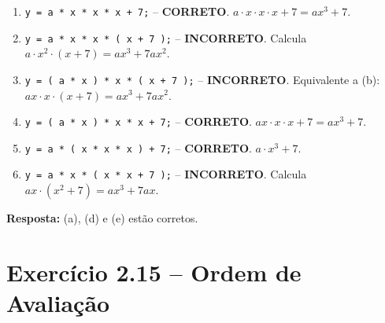 \documentclass[12pt,a4paper]{article}
\begin{document}
\begin{respostabox}
\begin{enumerate}[label=\textbf{\alph*)}]
\item \texttt{y = a * x * x * x + 7;} -- \textcolor{deitelgreen}{\textbf{CORRETO}}.
$a \cdot x \cdot x \cdot x + 7 = ax^3 + 7$.

\item \texttt{y = a * x * x * ( x + 7 );} -- \textcolor{deitelred}{\textbf{INCORRETO}}.
Calcula $a \cdot x^2 \cdot (x + 7) = ax^3 + 7ax^2$.

\item \texttt{y = ( a * x ) * x * ( x + 7 );} -- \textcolor{deitelred}{\textbf{INCORRETO}}.
Equivalente a (b): $ax \cdot x \cdot (x+7) = ax^3 + 7ax^2$.

\item \texttt{y = ( a * x ) * x * x + 7;} -- \textcolor{deitelgreen}{\textbf{CORRETO}}.
$ax \cdot x \cdot x + 7 = ax^3 + 7$.

\item \texttt{y = a * ( x * x * x ) + 7;} -- \textcolor{deitelgreen}{\textbf{CORRETO}}.
$a \cdot x^3 + 7$.

\item \texttt{y = a * x * ( x * x + 7 );} -- \textcolor{deitelred}{\textbf{INCORRETO}}.
Calcula $ax \cdot (x^2 + 7) = ax^3 + 7ax$.
\end{enumerate}

\textbf{Resposta:} (a), (d) e (e) estão corretos.
\end{respostabox}

\newpage

\section{Exercício 2.15 -- Ordem de Avaliação}
\end{document}
